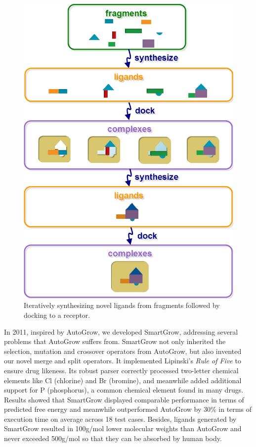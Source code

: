 \begin{figure}
\centering
\includegraphics[width=\textwidth]{igrow/SynthesisAndDocking.png}
\caption{Iteratively synthesizing novel ligands from fragments followed by docking to a receptor.}
\label{igrow:SynthesisAndDocking}
\end{figure}

In 2011, inspired by AutoGrow, we developed SmartGrow, addressing several problems that AutoGrow suffers from. SmartGrow not only inherited the selection, mutation and crossover operators from AutoGrow, but also invented our novel merge and split operators. It implemented Lipinski's \textit{Rule of Five} \citep{168} to ensure drug likeness. Its robust parser correctly processed two-letter chemical elements like Cl (chlorine) and Br (bromine), and meanwhile added additional support for P (phosphorus), a common chemical element found in many drugs. Results showed that SmartGrow displayed comparable performance in terms of predicted free energy and meanwhile outperformed AutoGrow by 30\% in terms of execution time on average across 18 test cases. Besides, ligands generated by SmartGrow resulted in 100g/mol lower molecular weights than AutoGrow and never exceeded 500g/mol so that they can be absorbed by human body.

